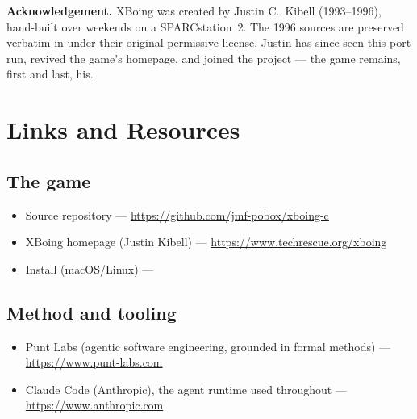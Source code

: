 \documentclass[11pt,a4paper]{article}
\begin{document}
\vspace{1em}
\noindent\textbf{Acknowledgement.} XBoing was created by Justin C.\ Kibell
(1993--1996), hand-built over weekends on a SPARCstation~2. The 1996 sources
are preserved verbatim in  under their original
permissive license. Justin has since seen this port run, revived the game's
homepage, and joined the project --- the game remains, first and last, his.



\newpage
\appendix
\section{Links and Resources}

\subsection*{The game}
\begin{itemize}[nosep]
  \item Source repository ---
        \url{https://github.com/jmf-pobox/xboing-c}
  \item XBoing homepage (Justin Kibell) ---
        \url{https://www.techrescue.org/xboing}
  \item Install (macOS/Linux) --- 
\end{itemize}

\subsection*{Method and tooling}
\begin{itemize}[nosep]
  \item Punt Labs (agentic software engineering, grounded in formal
        methods) --- \url{https://www.punt-labs.com}
  \item Claude Code (Anthropic), the agent runtime used throughout ---
        \url{https://www.anthropic.com}
\end{itemize}
\end{document}
